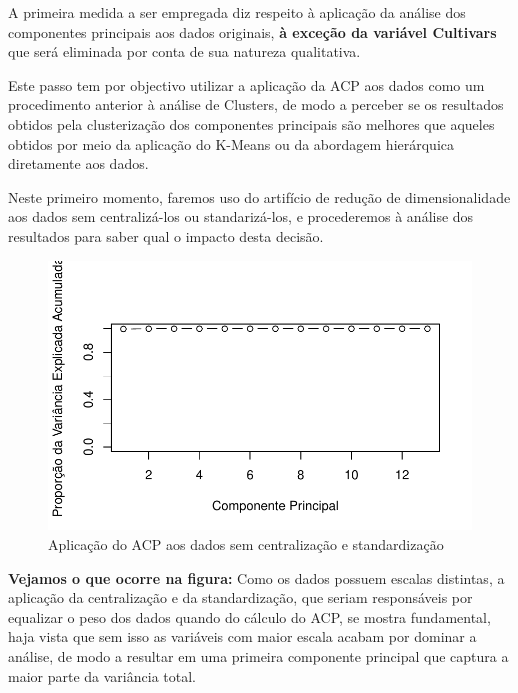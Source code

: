 \documentclass[
  letterpaper,
  DIV=11,
  numbers=noendperiod]{scrartcl}
\begin{document}
A primeira medida a ser empregada diz respeito à aplicação da análise
dos componentes principais aos dados originais, \textbf{à exceção da
variável Cultivars} que será eliminada por conta de sua natureza
qualitativa.

Este passo tem por objectivo utilizar a aplicação da ACP aos dados como
um procedimento anterior à análise de Clusters, de modo a perceber se os
resultados obtidos pela clusterização dos componentes principais são
melhores que aqueles obtidos por meio da aplicação do K-Means ou da
abordagem hierárquica diretamente aos dados.

Neste primeiro momento, faremos uso do artifício de redução de
dimensionalidade aos dados sem centralizá-los ou standarizá-los, e
procederemos à análise dos resultados para saber qual o impacto desta
decisão.

\begin{figure}[H]

{\centering \includegraphics{wines_analysis_files/figure-pdf/unnamed-chunk-18-1.pdf}

}

\caption{Aplicação do ACP aos dados sem centralização e standardização}

\end{figure}%

\textbf{Vejamos o que ocorre na figura:} Como os dados possuem escalas
distintas, a aplicação da centralização e da standardização, que seriam
responsáveis por equalizar o peso dos dados quando do cálculo do ACP, se
mostra fundamental, haja vista que sem isso as variáveis com maior
escala acabam por dominar a análise, de modo a resultar em uma primeira
componente principal que captura a maior parte da variância total.
\end{document}
